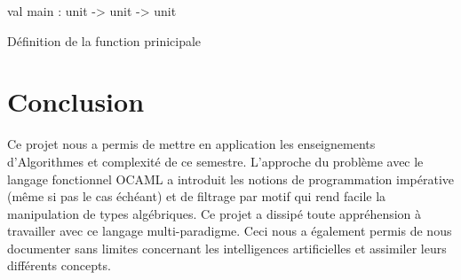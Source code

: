 \documentclass[11pt]{article}
\begin{document}
\label{val:Othello.main}\begin{ocamldoccode}
val main : unit -> unit -> unit
\end{ocamldoccode}
\begin{ocamldocdescription}
Définition de la function prinicipale


\end{ocamldocdescription}


\section{Conclusion}

Ce projet nous a permis de mettre en application les enseignements d'Algorithmes et complexité de ce semestre. L'approche du problème avec le langage fonctionnel OCAML a introduit les notions de programmation impérative (même si pas le cas échéant) et de filtrage par motif qui rend facile la manipulation de types algébriques. Ce projet a dissipé toute appréhension à travailler avec ce langage multi-paradigme. Ceci nous a également permis de nous documenter sans limites concernant les intelligences artificielles et assimiler leurs différents concepts.
\end{document}
